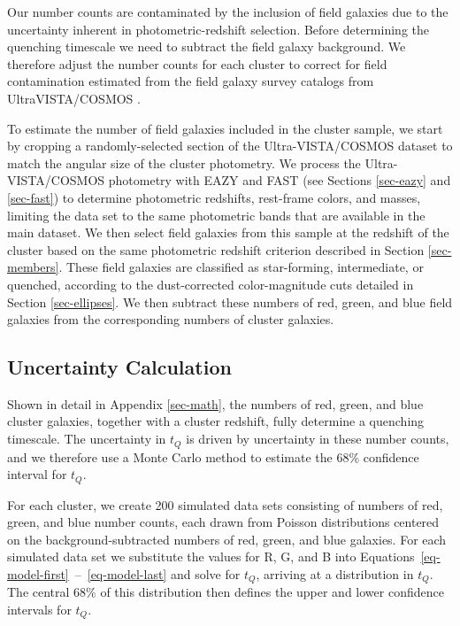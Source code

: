 Our number counts are contaminated by the inclusion of field galaxies due to the uncertainty inherent in photometric-redshift selection.
Before determining the quenching timescale we need to subtract the field galaxy background.
We therefore adjust the number counts for each cluster to correct for field contamination estimated from the field galaxy survey catalogs from UltraVISTA/COSMOS \citep{muzzin2013}.

To estimate the number of field galaxies included in the cluster sample, we start by cropping a randomly-selected section of the Ultra-VISTA/COSMOS dataset to match the angular size of the cluster photometry.
We process the Ultra-VISTA/COSMOS photometry with EAZY and FAST (see Sections \ref{sec-eazy} and \ref{sec-fast}) to determine photometric redshifts, rest-frame colors, and masses, limiting the data set to the same photometric bands that are available in the main dataset.
We then select field galaxies from this sample at the redshift of the cluster based on the same photometric redshift criterion described in Section \ref{sec-members}.
These field galaxies are classified as star-forming, intermediate, or quenched, according to the dust-corrected color-magnitude cuts detailed in Section \ref{sec-ellipses}.
We then subtract these numbers of red, green, and blue field galaxies from the corresponding numbers of cluster galaxies.

\subsection{Uncertainty Calculation}\label{sec-error}

Shown in detail in Appendix \ref{sec-math}, the numbers of red, green, and blue cluster galaxies, together with a cluster redshift, fully determine a quenching timescale.
The uncertainty in $t_Q$ is driven by uncertainty in these number counts, and we therefore use a Monte Carlo method to estimate the $68\%$ confidence interval for $t_Q$.

For each cluster, we create 200 simulated data sets consisting of numbers of red, green, and blue number counts, each drawn from Poisson distributions centered on the background-subtracted numbers of red, green, and blue galaxies.
For each simulated data set we substitute the values for R, G, and B into Equations~\eqref{eq-model-first}~--~\eqref{eq-model-last} and solve for $t_Q$, arriving at a distribution in $t_Q$.
The central $68\%$ of this distribution then defines the upper and lower confidence intervals for $t_Q$.

